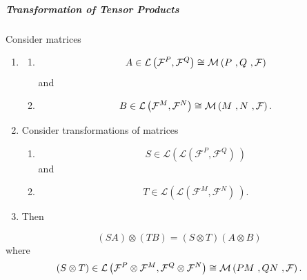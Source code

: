 \documentclass[aps,preprint]{revtex4}
\begin{document}
\subparagraph{Transformation of Tensor Products \label{Transformation of
Tensor Products}}

Consider matrices

\begin{enumerate}
\item 
\begin{enumerate}
\item 
\begin{equation}
A\in \mathcal{L}\left( \mathcal{F}^{P},\mathcal{F}^{Q}\right) \cong \mathcal{%
M}\left( P\ ,Q\ ,\mathcal{F}\right)
\end{equation}
and

\item 
\begin{equation}
B\in \mathcal{L}\left( \mathcal{F}^{M},\mathcal{F}^{N}\right) \cong \mathcal{%
M}\left( M\ ,N\ ,\mathcal{F}\right) .
\end{equation}
\end{enumerate}

\item Consider transformations of matrices

\begin{enumerate}
\item 
\begin{equation}
S\in \mathcal{L}\left( \mathcal{L}\left( \mathcal{F}^{P},\mathcal{F}%
^{Q}\right) \ \right)
\end{equation}%
and

\item 
\begin{equation}
T\in \mathcal{L}\left( \mathcal{L}\left( \mathcal{F}^{M},\mathcal{F}%
^{N}\right) \ \right) .
\end{equation}
\end{enumerate}

\item Then
\end{enumerate}

\begin{equation}
\left( SA\right) \otimes \left( TB\right) =\left( S\otimes T\right) \left(
A\otimes B\right)
\end{equation}%
where 
\begin{equation}
\left( S\otimes T\right) \in \mathcal{L}\left( \mathcal{F}^{P}\otimes 
\mathcal{F}^{M},\mathcal{F}^{Q}\otimes \mathcal{F}^{N}\right) \cong \mathcal{%
M}\left( PM\ ,QN\ ,\mathcal{F}\right) .
\end{equation}
\end{document}
